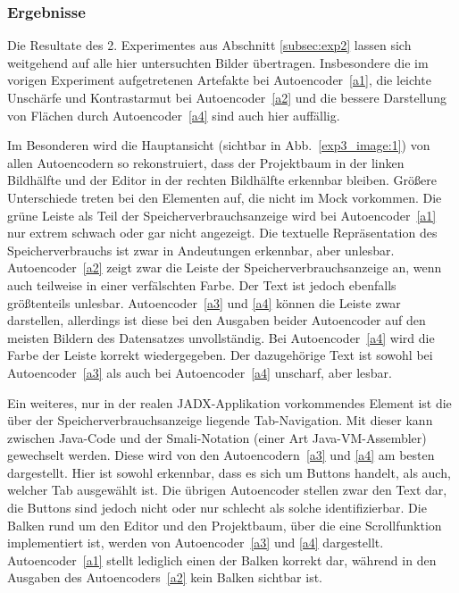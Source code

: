 \pagebreak
\subsubsection*{Ergebnisse}
Die Resultate des 2. Experimentes aus Abschnitt \ref{subsec:exp2} lassen sich weitgehend auf alle hier untersuchten Bilder übertragen. Insbesondere die im vorigen Experiment aufgetretenen Artefakte bei Autoencoder~\ref{a1}, die leichte Unschärfe und Kontrastarmut bei Autoencoder~\ref{a2} und die bessere Darstellung von Flächen durch Autoencoder~\ref{a4} sind auch hier auffällig.

Im Besonderen wird die Hauptansicht (sichtbar in Abb.~\ref{exp3_image:1}) von allen Autoencodern so rekonstruiert, dass der Projektbaum in der linken Bildhälfte und der Editor in der rechten Bildhälfte erkennbar bleiben. Größere Unterschiede treten bei den Elementen auf, die nicht im Mock vorkommen. Die grüne Leiste als Teil der Speicherverbrauchsanzeige wird bei Autoencoder~\ref{a1} nur extrem schwach oder gar nicht angezeigt. Die textuelle Repräsentation des Speicherverbrauchs ist zwar in Andeutungen erkennbar, aber unlesbar. Autoencoder~\ref{a2} zeigt zwar die Leiste der Speicherverbrauchsanzeige an, wenn auch teilweise in einer verfälschten Farbe. Der Text ist jedoch ebenfalls größtenteils unlesbar. Autoencoder~\ref{a3} und \ref{a4} können die Leiste zwar darstellen, allerdings ist diese bei den Ausgaben beider Autoencoder auf den meisten Bildern des Datensatzes unvollständig. Bei Autoencoder~\ref{a4} wird die Farbe der Leiste korrekt wiedergegeben. Der dazugehörige Text ist sowohl bei Autoencoder~\ref{a3} als auch bei Autoencoder~\ref{a4} unscharf, aber lesbar.

Ein weiteres, nur in der realen JADX-Applikation vorkommendes Element ist die über der Speicherverbrauchsanzeige liegende Tab-Navigation. Mit dieser kann zwischen Java-Code und der Smali-Notation (einer Art Java-VM-Assembler) gewechselt werden. Diese wird von den Autoencodern~\ref{a3} und \ref{a4} am besten dargestellt. Hier ist sowohl erkennbar, dass es sich um Buttons handelt, als auch, welcher Tab ausgewählt ist. Die übrigen Autoencoder stellen zwar den Text dar, die Buttons sind jedoch nicht oder nur schlecht als solche identifizierbar. Die Balken rund um den Editor und den Projektbaum, über die eine Scrollfunktion implementiert ist, werden von Autoencoder~\ref{a3} und \ref{a4} dargestellt. Autoencoder~\ref{a1} stellt lediglich einen der Balken korrekt dar, während in den Ausgaben des Autoencoders~\ref{a2} kein Balken sichtbar ist.

